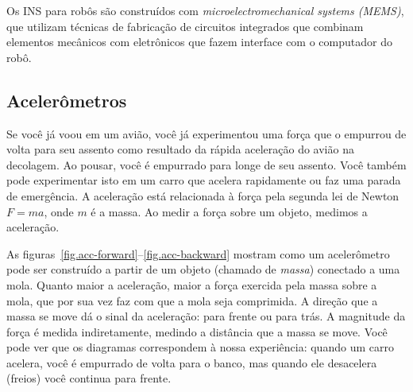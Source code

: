 {Os INS para robôs são construídos com \emph{microelectromechanical systems (MEMS)}, que utilizam técnicas de fabricação de circuitos integrados que combinam elementos mecânicos com eletrônicos que fazem interface com o computador do robô.

\subsection{Acelerômetros}\label{s.accelerometer}

Se você já voou em um avião, você já experimentou uma força que o empurrou de volta para seu assento como resultado da rápida aceleração do avião na decolagem. Ao pousar, você é empurrado para longe de seu assento. Você também pode experimentar isto em um carro que acelera rapidamente ou faz uma parada de emergência. A aceleração está relacionada à força pela segunda lei de Newton $F=ma$, onde $m$ é a massa. Ao medir a força sobre um objeto, medimos a aceleração.

As figuras~\ref{fig.acc-forward}--\ref{fig.acc-backward} mostram como um acelerômetro pode ser construído a partir de um objeto (chamado de \emph{massa}) conectado a uma mola. Quanto maior a aceleração, maior a força exercida pela massa sobre a mola, que por sua vez faz com que a mola seja comprimida. A direção que a massa se move dá o sinal da aceleração: para frente ou para trás. A magnitude da força é medida indiretamente, medindo a distância que a massa se move. Você pode ver que os diagramas correspondem à nossa experiência: quando um carro acelera, você é empurrado de volta para o banco, mas quando ele desacelera (freios) você continua para frente.

}
